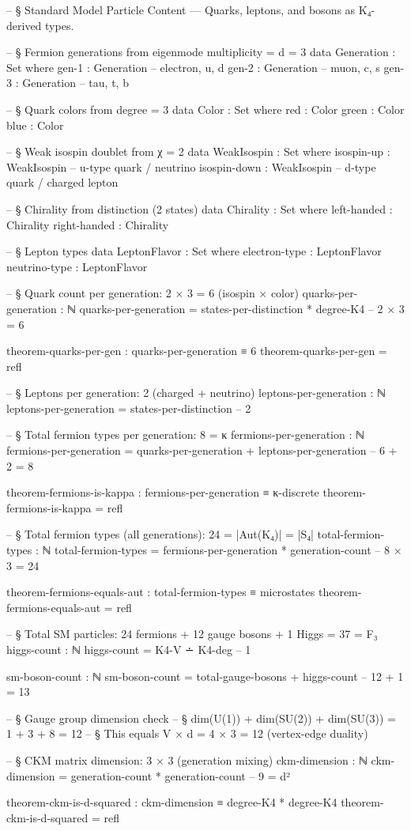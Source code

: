 \documentclass[11pt,a4paper]{book}
\begin{document}
\begin{code}
-- § Standard Model Particle Content — Quarks, leptons, and bosons as K₄-derived types.

-- § Fermion generations from eigenmode multiplicity = d = 3
data Generation : Set where
  gen-1 : Generation  -- electron, u, d
  gen-2 : Generation  -- muon, c, s
  gen-3 : Generation  -- tau, t, b

-- § Quark colors from degree = 3
data Color : Set where
  red   : Color
  green : Color
  blue  : Color

-- § Weak isospin doublet from χ = 2
data WeakIsospin : Set where
  isospin-up   : WeakIsospin  -- u-type quark / neutrino
  isospin-down : WeakIsospin  -- d-type quark / charged lepton

-- § Chirality from distinction (2 states)
data Chirality : Set where
  left-handed  : Chirality
  right-handed : Chirality

-- § Lepton types
data LeptonFlavor : Set where
  electron-type : LeptonFlavor
  neutrino-type : LeptonFlavor

-- § Quark count per generation: 2 × 3 = 6 (isospin × color)
quarks-per-generation : ℕ
quarks-per-generation = states-per-distinction * degree-K4  -- 2 × 3 = 6

theorem-quarks-per-gen : quarks-per-generation ≡ 6
theorem-quarks-per-gen = refl

-- § Leptons per generation: 2 (charged + neutrino)
leptons-per-generation : ℕ
leptons-per-generation = states-per-distinction  -- 2

-- § Total fermion types per generation: 8 = κ
fermions-per-generation : ℕ
fermions-per-generation = quarks-per-generation + leptons-per-generation  -- 6 + 2 = 8

theorem-fermions-is-kappa : fermions-per-generation ≡ κ-discrete
theorem-fermions-is-kappa = refl

-- § Total fermion types (all generations): 24 = |Aut(K₄)| = |S₄|
total-fermion-types : ℕ
total-fermion-types = fermions-per-generation * generation-count  -- 8 × 3 = 24

theorem-fermions-equals-aut : total-fermion-types ≡ microstates
theorem-fermions-equals-aut = refl

-- § Total SM particles: 24 fermions + 12 gauge bosons + 1 Higgs = 37 = F₃
higgs-count : ℕ
higgs-count = K4-V ∸ K4-deg  -- 1

sm-boson-count : ℕ
sm-boson-count = total-gauge-bosons + higgs-count  -- 12 + 1 = 13

-- § Gauge group dimension check
-- § dim(U(1)) + dim(SU(2)) + dim(SU(3)) = 1 + 3 + 8 = 12
-- § This equals V × d = 4 × 3 = 12 (vertex-edge duality)

-- § CKM matrix dimension: 3 × 3 (generation mixing)
ckm-dimension : ℕ
ckm-dimension = generation-count * generation-count  -- 9 = d²

theorem-ckm-is-d-squared : ckm-dimension ≡ degree-K4 * degree-K4
theorem-ckm-is-d-squared = refl
\end{code}
\end{document}
